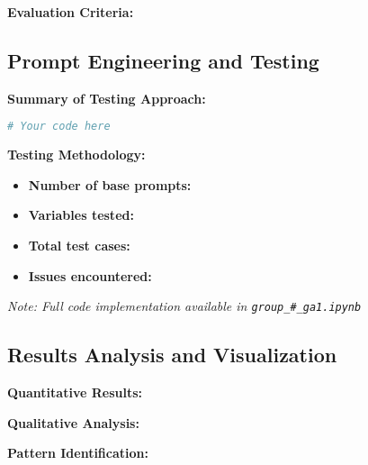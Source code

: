 \documentclass[11pt]{article}
\begin{document}
\textbf{Evaluation Criteria:}


\subsection{Prompt Engineering and Testing}

\textbf{Summary of Testing Approach:}


\begin{lstlisting}[language=Python, caption=Your Caption]
# Your code here
\end{lstlisting}

\textbf{Testing Methodology:}
\begin{itemize}
    \item \textbf{Number of base prompts:} %
    \item \textbf{Variables tested:} %
    \item \textbf{Total test cases:} %
    \item \textbf{Issues encountered:} %
\end{itemize}

\textit{Note: Full code implementation available in \texttt{group\_\#\_ga1.ipynb}}

\subsection{Results Analysis and Visualization}

\textbf{Quantitative Results:}



\textbf{Qualitative Analysis:} 


\textbf{Pattern Identification:}
\end{document}

